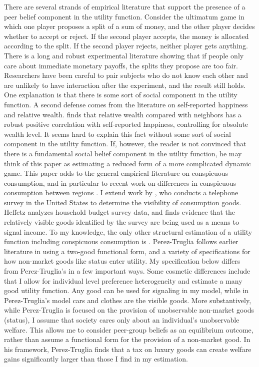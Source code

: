 \documentclass[12pt]{article}
\begin{document}
There are several strands of empirical literature that support the presence of a peer belief component in the utility function.  Consider the ultimatum game in which one player proposes a split of a sum of money, and the other player decides whether to accept or reject.  If the second player accepts, the money is allocated according to the split. If the second player rejects, neither player gets anything.  There is a long and robust experimental literature showing that if people only care about immediate monetary payoffs, the splits they propose are too fair.  Researchers have been careful to pair subjects who do not know each other and are unlikely to have interaction after the experiment, and the result still holds.  One explanation is that there is some sort of social component in the utility function. \citep{FehrSchmidt1999,BoltonOckenfels2000}  A second defense comes from the literature on self-reported happiness and relative wealth.  \citet{Luttmer2004} finds that relative wealth compared with neighbors has a robust positive correlation  with self-reported happiness, controlling for absolute wealth level.  It seems hard to explain this fact without some sort of social component in the utility function.  If, however, the reader is not convinced that there is a fundamental social belief component in the utility function, he may think of this paper as estimating a reduced form of a more complicated dynamic game.  
This paper adds to the general empirical literature on conspicuous consumption,\citep{Blochetal2004,Charlesetal2009,MoavNeeman2010,MoavNeeman2012} and in particular to recent work on differences in conspicuous consumption between regions \citep{friehe2014conspicuous}.  I extend work by \citet{heffetz2011}, who conducts a telephone survey in the United States to determine the visibility of consumption goods.  Heffetz analyzes household budget survey data, and finds evidence that the relatively visible goods identified by the survey are being used as a means to signal income.  To my knowledge, the only other structural estimation of a utility function including conspicuous consumption is \citet{perez2013measuring}.  Perez-Truglia follows earlier literature in using a two-good functional form, and a variety of specifications for how non-market goods like status enter utility.  My specification below differs from Perez-Truglia's in a few important ways.  Some cosmetic differences include that I allow for individual level preference heterogeneity and estimate a many good utility function.  Any good can be used for signaling in my model, while in Perez-Truglia's model cars and clothes are the visible goods.  More substantively, while Perez-Truglia is focused on the provision of unobservable non-market goods (status), I assume that society cares only about an individual's unobservable welfare.  This allows me to consider peer-group beliefs as an equilibrium outcome, rather than assume a functional form for the provision of a non-market good.  In his framework, Perez-Truglia finds that a tax on luxury goods can create welfare gains significantly larger than those I find in my estimation.
\end{document}
